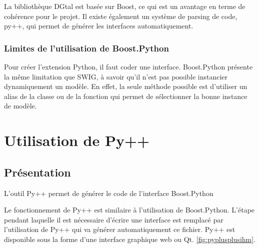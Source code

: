 \documentclass[11pt, french, screen]{report-rd-info}
\begin{document}
La bibliothèque DGtal est basée sur Boost, ce qui est un avantage en terme de cohérence pour le projet. Il existe également un système de parsing de code, py++, qui permet de générer les interfaces automatiquement.

\subsubsection{Limites de l'utilisation de Boost.Python}

Pour créer l'extension Python, il faut coder une interface. Boost.Python présente la même limitation que SWIG, à savoir qu'il n'est pas possible instancier dynamiquement un modèle. En effet, la seule méthode possible est d'utiliser un alias de la classe ou de la fonction qui permet de sélectionner la bonne instance de modèle.

\section{Utilisation de Py++}

\subsection{Présentation}

L'outil Py++ permet de générer le code de l'interface Boost.Python









Le fonctionnement de Py++ est similaire à l'utilisation de Boost.Python. L'étape pendant laquelle il est nécessaire d'écrire une interface est remplacé par l'utilisation de Py++ qui va générer automatiquement ce fichier. Py++ est disponible sous la forme d'une interface graphique web ou Qt. \ref{fig:pyplusplusihm}.
\end{document}
